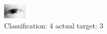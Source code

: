 \begin{figure}[h!]
\begin{center}
\includegraphics[width=0.60\columnwidth]{figures/ID144_class_4_target_3.png}
\end{center}
\caption{ Classification: 4 actual target: 3}
\label{fig:ID144_class_4_target_3}
\end{figure}
